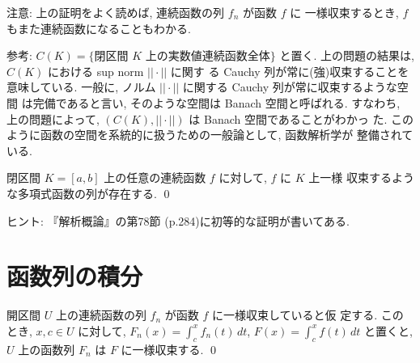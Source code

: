 \documentclass[12pt,twoside]{jarticle}
\begin{document}
\noindent 注意: 上の証明をよく読めば, 連続函数の列 $f_n$ が函数 $f$ に
一様収束するとき, $f$ もまた連続函数になることもわかる.

\medskip
\begin{small}

\noindent 参考: %
$C(K) = \{ \text{閉区間 $K$ 上の実数値連続函数全体} \}$ %
と置く. 上の問題の結果は, $C(K)$ における sup norm $||\cdot||$ に関す
る Cauchy 列が常に(強)収束することを意味している. %
一般に, ノルム $||\cdot||$ に関する Cauchy 列が常に収束するような空間
は完備であると言い, そのような空間は Banach 空間と呼ばれる. すなわち, 
上の問題によって, $(C(K), ||\cdot||)$ は Banach 空間であることがわかっ
た. このように函数の空間を系統的に扱うための一般論として, 函数解析学が
整備されている.

\end{small}

\begin{question}[Weierstrassの多項式近似定理]\qstar{*}
  閉区間 $K=[a,b]$ 上の任意の連続函数 $f$ に対して, $f$ に $K$ 上一様
  収束するような多項式函数の列が存在する. \qed
\end{question}

\noindent ヒント: 『解析概論』の第78節 (p.284)に初等的な証明が書いてある.


\section{函数列の積分}

\begin{question}
  開区間 $U$ 上の連続函数の列 $f_n$ が函数 $f$ に一様収束していると仮
  定する. このとき, $x,c\in U$ に対して, %
  $F_n(x) = \int_c^x f_n(t)\,dt$, %
  $F(x) = \int_c^x f(t) \,dt$ %
  と置くと, $U$ 上の函数列 $F_n$ は $F$ に一様収束する.
  \qed
\end{question}
\end{document}
